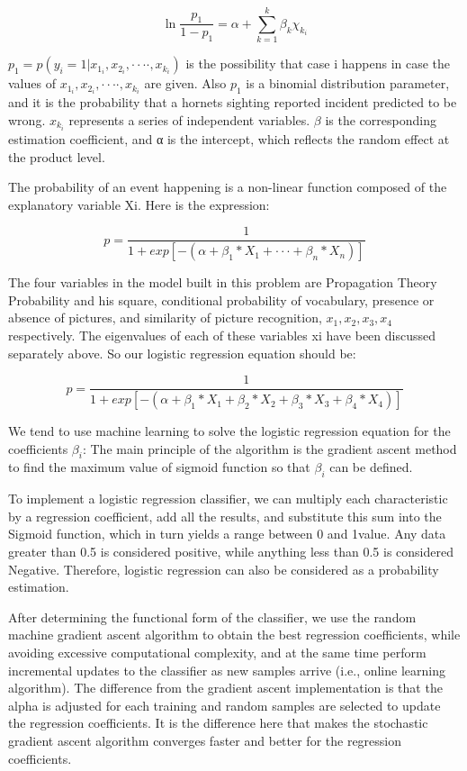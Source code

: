 \documentclass{mcmthesis}
\begin{document}
\begin{equation}
    \ln{\frac{p_1}{1-p_1}}=\alpha+\sum_{k=1}^k \beta_k\chi_k_i
    \label{6}
\end{equation}

$p_1=p(y_i=1|x_1_i,x_2_i,····,x_k_i)$ is the possibility that case i happens in case the values of $x_1_i,x_2_i,····,x_k_i$ are given. Also $p_1$ is a binomial distribution parameter, and it is the probability that a hornets sighting reported incident predicted to be wrong. $x_k_i$ represents a series of independent variables. $\beta$ is the corresponding estimation coefficient, and α is the intercept, which reflects the random effect at the product level.

The probability of an event happening is a non-linear function composed of the explanatory variable Xi. Here is the expression: 

\begin{equation}
    p=\frac{1}{1+exp[-(\alpha+\beta_1*X_1+\cdot\cdot\cdot+\beta_n*X_n)]}
    \label{6}
\end{equation}

The four variables in the model built in this problem are Propagation Theory Probability and his square, conditional probability of vocabulary, presence or absence of pictures, and similarity of picture recognition, $x_1,x_2,x_3,x_4$ respectively. The eigenvalues of each of these variables xi have been discussed separately above. So our logistic regression equation should be:

\begin{equation}
    p=\frac{1}{1+exp[-(\alpha+\beta_1*X_1+\beta_2*X_2+\beta_3*X_3+\beta_4*X_4)]}
    \label{6}
\end{equation}

We tend to use machine learning to solve the logistic regression equation for the coefficients $\beta_i$: The main principle of the algorithm is the gradient ascent method to find the maximum value of sigmoid function so that $\beta_i$ can be defined.

To implement a logistic regression classifier, we can multiply each characteristic by a regression coefficient, add all the results, and substitute this sum into the Sigmoid function, which in turn yields a range between 0 and 1value. Any data greater than 0.5 is considered positive, while anything less than 0.5 is considered Negative. Therefore, logistic regression can also be considered as a probability estimation.

After determining the functional form of the classifier, we use the random machine gradient ascent algorithm to obtain the best regression coefficients, while avoiding excessive computational complexity, and at the same time perform incremental updates to the classifier as new samples arrive (i.e., online learning algorithm). The difference from the gradient ascent implementation is that the alpha is adjusted for each training and random samples are selected to update the regression coefficients. It is the difference here that makes the stochastic gradient ascent algorithm converges faster and better for the regression coefficients.
\end{document}
